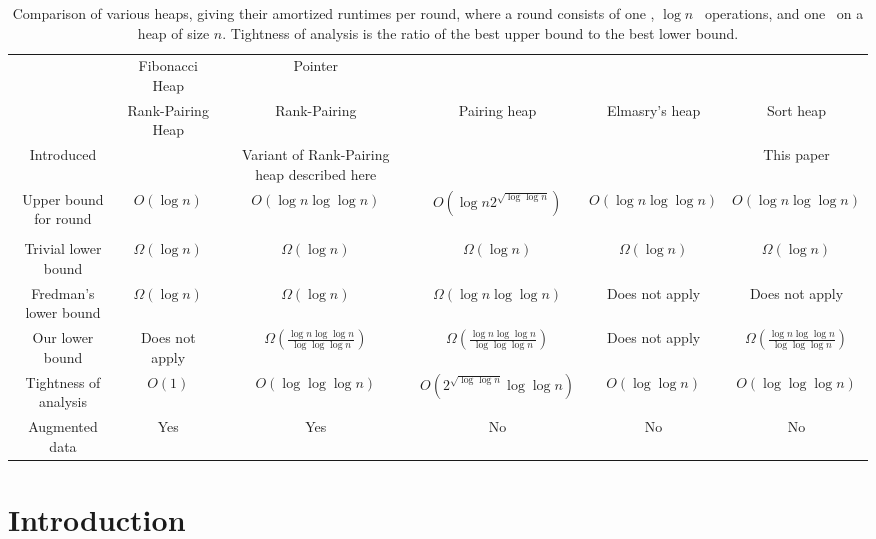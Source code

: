 \begin{fullonly}
\begin{sidewaystable} \footnotesize 
\begin{tabular}{c|ccccc}
&Fibonacci Heap& Pointer\\
&Rank-Pairing Heap &  Rank-Pairing & Pairing heap & Elmasry's heap & Sort heap\\ \hline \hline
Introduced &  \parbox{0.5in}{\center \cite{DBLP:journals/jacm/FredmanT87} \cite{DBLP:journals/siamcomp/HaeuplerST11}} & \parbox{1.5in}{\center Variant of Rank-Pairing heap described here} & \cite{DBLP:journals/algorithmica/FredmanSST86}&\cite{DBLP:conf/esa/Elmasry10,DBLP:conf/soda/Elmasry09}  & This paper\\ 
\hline
Upper bound for round & $O(\log n)$ & $O(\log n \log \log n)$ & $O(\log n2^{\sqrt{\log \log n}})$ & $O(\log n \log \log n)$ & $O(\log n \log \log n)$\\
&  & & \cite{DBLP:conf/focs/Pettie05} \\ 
\hline
Trivial lower bound & $\Omega(\log n)$ & $\Omega(\log n)$ & $\Omega(\log n)$ & $\Omega(\log n)$ & $\Omega(\log n)$\\
\parbox{1.5in}{\center Fredman's lower bound \cite{DBLP:journals/jacm/Fredman99}} & $\Omega(\log n)$ &$\Omega(\log n)$ &$\Omega(\log n \log \log n)$  &Does not apply &Does not apply\\
Our lower bound& Does not apply &  $\Omega\left( \frac{\log n \log \log n}{\log \log \log n} \right)$ &  $\Omega\left( \frac{\log n \log \log n}{\log \log \log n} \right)$ & Does not apply &  $\Omega\left( \frac{\log n \log \log n}{\log \log \log n} \right)$\\
\hline
Tightness of analysis & $O(1)$ & $O(\log \log \log n)$ & $O(2^{\sqrt{\log \log n}} \log \log  n)$ & $O(\log \log n)$ & $O(\log \log \log n)$\\
\hline
\hline
Augmented data & Yes & Yes & No & No & No
\end{tabular}
\caption{Comparison of various heaps, giving their amortized runtimes per round, where a round consists of one \opIns, $\log n$ \opDc\ operations, and one \opEm\ on a heap of size $n$. Tightness of analysis is the ratio of the best upper bound to the best lower bound. }
\end{sidewaystable}
\end{fullonly}



\section{Introduction}



